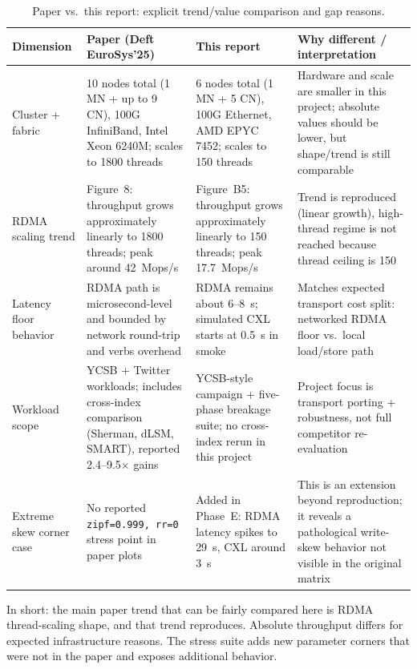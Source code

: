 \documentclass[10pt,twocolumn]{article}
\begin{document}
\begin{table}[t]
\centering
\footnotesize
\caption{Paper vs.\ this report: explicit trend/value comparison and gap reasons.}
\label{tab:papercompare}
\begin{tabular}{p{2.4cm}p{3.5cm}p{3.5cm}p{5.2cm}}
\toprule
Dimension & Paper (Deft EuroSys'25) & This report & Why different / interpretation \\
\midrule
Cluster + fabric & 10 nodes total (1 MN + up to 9 CN), 100G InfiniBand, Intel Xeon 6240M; scales to 1800 threads & 6 nodes total (1 MN + 5 CN), 100G Ethernet, AMD EPYC 7452; scales to 150 threads & Hardware and scale are smaller in this project; absolute values should be lower, but shape/trend is still comparable \\
RDMA scaling trend & Figure~8: throughput grows approximately linearly to 1800 threads; peak around 42~Mops/s & Figure~B5: throughput grows approximately linearly to 150 threads; peak 17.7~Mops/s & Trend is reproduced (linear growth), high-thread regime is not reached because thread ceiling is 150 \\
Latency floor behavior & RDMA path is microsecond-level and bounded by network round-trip and verbs overhead & RDMA remains about 6--8~\textmu{}s; simulated CXL starts at 0.5~\textmu{}s in smoke & Matches expected transport cost split: networked RDMA floor vs.\ local load/store path \\
Workload scope & YCSB + Twitter workloads; includes cross-index comparison (Sherman, dLSM, SMART), reported 2.4--9.5$\times$ gains & YCSB-style campaign + five-phase breakage suite; no cross-index rerun in this project & Project focus is transport porting + robustness, not full competitor re-evaluation \\
Extreme skew corner case & No reported \texttt{zipf=0.999, rr=0} stress point in paper plots & Added in Phase~E: RDMA latency spikes to 29~\textmu{}s, CXL around 3~\textmu{}s & This is an extension beyond reproduction; it reveals a pathological write-skew behavior not visible in the original matrix \\
\bottomrule
\end{tabular}
\end{table}

In short: the main paper trend that can be fairly compared here is RDMA
thread-scaling shape, and that trend reproduces.
Absolute throughput differs for expected infrastructure reasons.
The stress suite adds new parameter corners that were not in the paper and
exposes additional behavior.
\end{document}
